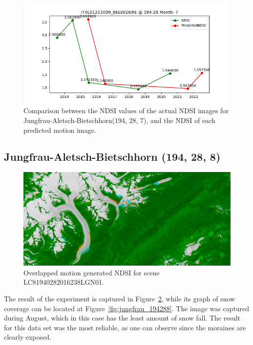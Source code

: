 \documentclass[12pt, a4paper]{report}
\begin{document}
	\begin{figure}[h!]
		\centering
		\includegraphics[scale=0.5]{../images/experiment_194287.png}
		\caption{Comparison between the NDSI values of the actual NDSI images for Jungfrau-Aletsch-Bietschhorn(194, 28, 7), and the NDSI of each predicted motion image.}
		\label{fig:jungfrau_194287}
	\end{figure}

	
	\newpage{}
	
	\subsection{Jungfrau-Aletsch-Bietschhorn (194, 28, 8)}
	
	\begin{figure}[h!]
		\centering
		\includegraphics[width=\linewidth]{../images/experiment_1940288_image.png}
		\caption{Overlapped motion generated NDSI for scene LC81940282016238LGN01.}
		\label{fig:experiment_1940288_image}
	\end{figure}

	The result of the experiment is captured in Figure~\ref{fig:experiment_1940288_image}, while its graph of snow coverage can be located at Figure~\ref{fig:jungfrau_194288}. The image was captured during August, which in this case has the least amount of snow fall. The result for this data set was the most reliable, as one can observe since the moraines are clearly exposed. 
	
\end{document}
